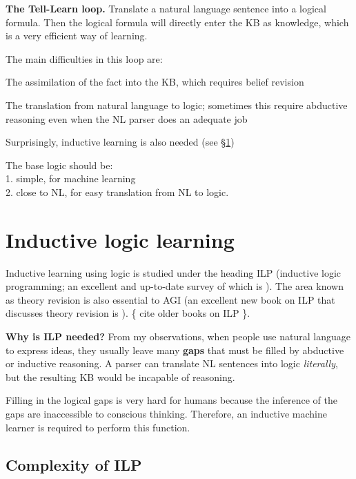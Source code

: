 \documentclass[a4paper]{report}
\begin{document}
\textbf{The Tell-Learn loop.}  Translate a natural language sentence into a logical formula.  Then the logical formula will directly enter the KB as knowledge, which is a very efficient way of learning.

The main difficulties in this loop are:
\begin{compactenum}[1.]
\item  The assimilation of the fact into the KB, which requires belief revision
\item  The translation from natural language to logic;  sometimes this require abductive reasoning even when the NL parser does an adequate job
\item  Surprisingly, inductive learning is also needed (see \S\ref{sec:ILP})\\
\end{compactenum}

The base logic should be:\\
1. simple, for machine learning\\
2. close to NL, for easy translation from NL to logic.

\section{Inductive logic learning}
\label{sec:ILP}

Inductive learning using logic is studied under the heading ILP (inductive logic programming; an excellent and up-to-date survey of which is \citep*{Konstantopoulos2008}).  The area known as theory revision is also essential to AGI (an excellent new book on ILP that discusses theory revision is \citep*{DeRaedt2008}).  \{ cite older books on ILP \}.

\textbf{Why is ILP needed?}  From my observations, when people use natural language to express ideas, they usually leave many \textbf{gaps} that must be filled by abductive or inductive reasoning.  A parser can translate NL sentences into logic \textit{literally}, but the resulting KB would be incapable of reasoning.

Filling in the logical gaps is very hard for humans because the inference of the gaps are inaccessible to conscious thinking.  Therefore, an inductive machine learner is required to perform this function.

\subsection{Complexity of ILP}
\end{document}
